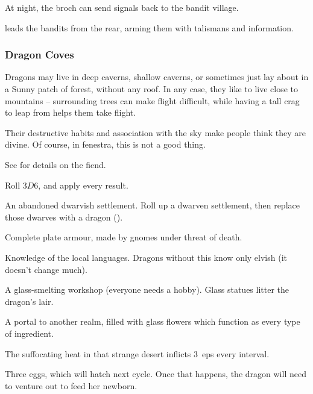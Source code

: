 \begin{multicols}{2}
\begin{dlist}
  At night, the \gls{broch} can send signals back to the bandit \gls{village}.
  \item
   leads the bandits from the rear, arming them with \glspl{talisman} and information.
\end{dlist}

\subsubsection{Dragon Coves}
\label{dragonPoint}

Dragons may live in deep caverns, shallow caverns, or sometimes just lay about in a Sunny patch of forest, without any roof.
In any case, they like to live close to mountains -- surrounding trees can make flight difficult, while having a tall crag to leap from helps them take flight.

Their destructive habits and association with the sky make people think they are divine.
Of course, in \gls{fenestra}, this is not a good thing.

See  for details on the fiend.

Roll $3D6$, and apply every result.

\begin{dlist}
  \item
  An abandoned dwarvish settlement.
  Roll up a dwarven settlement, then replace those dwarves with a dragon ().
  \item
  Complete plate armour, made by gnomes under threat of death.
  \iftoggle{core}{(See the core rules, \autopageref{bandingArmour}.)}{}
  \item
  Knowledge of the local languages.
  Dragons without this know only elvish (it doesn't change much).
  \item
  A glass-smelting workshop (everyone needs a hobby).
  Glass statues litter the dragon's lair.
  \item
  A portal to another realm, filled with glass flowers which function as every type of \gls{ingredient}.

  The suffocating heat in that strange desert inflicts 3~\glspl{ep} every \gls{interval}.
  \item
  Three eggs, which will hatch next \gls{cycle}.
  Once that happens, the dragon will need to venture out to feed her newborn.
\end{dlist}


\end{multicols}
